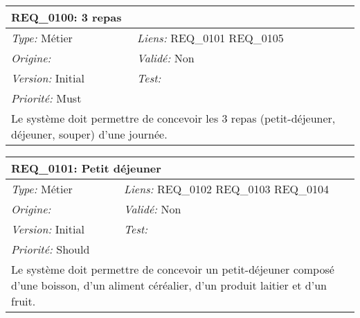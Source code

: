 
\begin{table}[!h]

\begin{tabular}{|p{60mm}p{100mm}|}

\hline

\multicolumn{2}{|l|}{\textbf{REQ\_0100:} 3 repas} \\ \hline

\emph{Type:} Métier & \emph{Liens:} REQ\_0101 REQ\_0105  \\

\emph{Origine:}  & \emph{Validé:} Non \\

\emph{Version:} Initial & \emph{Test:}  \\

\emph{Priorité:} Must & \\ \hline

\multicolumn{2}{|p{16cm}|}{Le système doit permettre de concevoir les 3 repas (petit-déjeuner, déjeuner, souper) d'une journée.} \\ \hline

\end{tabular}

\end{table}



\begin{table}[!h]

\begin{tabular}{|p{60mm}p{100mm}|}

\hline

\multicolumn{2}{|l|}{\textbf{REQ\_0101:} Petit déjeuner} \\ \hline

\emph{Type:} Métier & \emph{Liens:} REQ\_0102 REQ\_0103 REQ\_0104  \\

\emph{Origine:}  & \emph{Validé:} Non \\

\emph{Version:} Initial & \emph{Test:}  \\

\emph{Priorité:} Should & \\ \hline

\multicolumn{2}{|p{16cm}|}{Le système doit permettre de concevoir un petit-déjeuner composé d'une boisson, d'un aliment céréalier, d'un produit laitier et d'un fruit.} \\ \hline

\end{tabular}

\end{table}



